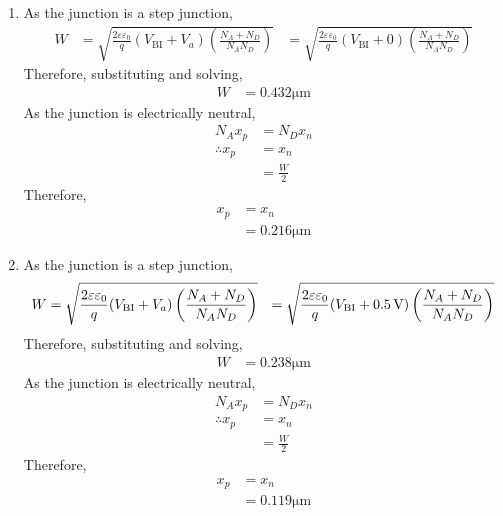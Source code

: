 \documentclass[titlepage, fleqn, a4paper, 12pt, twoside]{article}
\theoremstyle{definition}
\theoremstyle{theorem}
\begin{document}
\begin{solution}
	\begin{enumerate}[leftmargin=*]
		\item
			As the junction is a step junction,
			\begin{align*}
				W & = \sqrt{\frac{2 \varepsilon \varepsilon_0}{q} (V_{\text{BI}} + V_a) \left( \frac{N_A + N_D}{N_A N_D} \right)}
                                  & = \sqrt{\frac{2 \varepsilon \varepsilon_0}{q} (V_{\text{BI}} + 0) \left( \frac{N_A + N_D}{N_A N_D} \right)}
			\end{align*}
			Therefore, substituting and solving,
			\begin{align*}
				W & = 0.432 \si{\micro\metre}
			\end{align*}
			As the junction is electrically neutral,
			\begin{align*}
				N_A x_p        & = N_D x_n \\
				\therefore x_p & = x_n     \\
                                               & = \frac{W}{2}
			\end{align*}
			Therefore,
			\begin{align*}
				x_p & = x_n \\
                                    & = 0.216 \si{\micro\metre}
			\end{align*}
		\item
			As the junction is a step junction,
			\begin{align*}
				W & = \sqrt{\frac{2 \varepsilon \varepsilon_0}{q} (V_{\text{BI}} + V_a) \left( \frac{N_A + N_D}{N_A N_D} \right)}
                                  & = \sqrt{\frac{2 \varepsilon \varepsilon_0}{q} (V_{\text{BI}} + 0.5 \volt) \left( \frac{N_A + N_D}{N_A N_D} \right)}
			\end{align*}
			Therefore, substituting and solving,
			\begin{align*}
				W & = 0.238 \si{\micro\metre}
			\end{align*}
			As the junction is electrically neutral,
			\begin{align*}
				N_A x_p        & = N_D x_n \\
				\therefore x_p & = x_n     \\
                                               & = \frac{W}{2}
			\end{align*}
			Therefore,
			\begin{align*}
				x_p & = x_n \\
                                    & = 0.119 \si{\micro\metre}

\end{align*}
\end{enumerate}
\end{solution}
\end{document}
